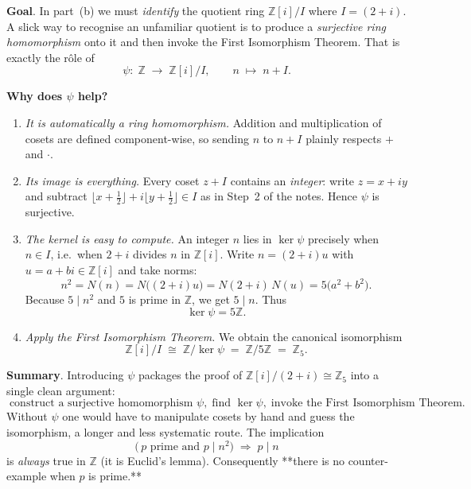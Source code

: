 \documentclass[12pt]{article}
\theoremstyle{definition} %
\theoremstyle{plain} %
\begin{document}
\bigskip
\textbf{Goal}.  In part~(b) we must \emph{identify} the quotient ring
\(\mathbb Z[i]/I\) where \(I=(2+i)\).
A slick way to recognise an unfamiliar quotient is to produce a
\emph{surjective ring homomorphism} onto it and then invoke the
First Isomorphism Theorem.  
That is exactly the rôle of
\[
\psi:\;\mathbb Z \;\longrightarrow\; \mathbb Z[i]/I,
\qquad n\;\longmapsto\; n+I.
\]

\bigskip
\textbf{Why does \(\psi\) help?}

\begin{enumerate}
    \item \emph{It is automatically a ring homomorphism.}  
          Addition and multiplication of cosets are defined component-wise,
          so sending \(n\) to \(n+I\) plainly respects \(+\) and \(\cdot\).

    \item \emph{Its image is everything.}  
          Every coset \(z+I\) contains an \emph{integer}:
          write \(z=x+iy\) and subtract \(\lfloor x+\tfrac12\rfloor
          +i\lfloor y+\tfrac12\rfloor\in I\) as in Step~2 of the notes.
          Hence \(\psi\) is surjective.

    \item \emph{The kernel is easy to compute.}  
          An integer \(n\) lies in \(\ker\psi\) precisely when
          \(n\in I\), i.e.\ when \(2+i\) divides \(n\) in
          \(\mathbb Z[i]\).
          Write \(n=(2+i)u\) with \(u=a+bi\in\mathbb Z[i]\) and take norms:
          \[
               n^{2}=N(n)=N\bigl((2+i)u\bigr)=N(2+i)\,N(u)=5\bigl(a^{2}+b^{2}\bigr).
          \]
          Because \(5\mid n^{2}\) and \(5\) is prime in \(\mathbb Z\),
          we get \(5\mid n\).  Thus
          \[
               \ker\psi = 5\mathbb Z.
          \]

    \item \emph{Apply the First Isomorphism Theorem.}  
          We obtain the canonical isomorphism
          \[
                \mathbb Z[i]/I 
                \;\cong\; 
                \mathbb Z/\ker\psi
                \;=\;
                \mathbb Z/5\mathbb Z
                \;=\;
                \mathbb Z_{5}.
          \]
\end{enumerate}

\medskip
\textbf{Summary}.  Introducing \(\psi\) packages the proof of
\(\mathbb Z[i]/(2+i)\cong\mathbb Z_{5}\) into a
single clean argument:
\[
\boxed{\;
    \text{construct a surjective homomorphism }\psi,\;
    \text{find }\ker\psi,\;
    \text{invoke the First Isomorphism Theorem.}
\;}
\]
Without \(\psi\) one would have to manipulate cosets by hand and guess
the isomorphism, a longer and less systematic route.
The implication  
\[
\bigl(\,p \text{ prime and } p \mid n^{2}\bigr)\; \Longrightarrow\; p \mid n
\]
is \emph{always} true in \(\mathbb{Z}\) (it is Euclid’s lemma).  
Consequently **there is no counter-example when \(p\) is prime.**
\end{document}
